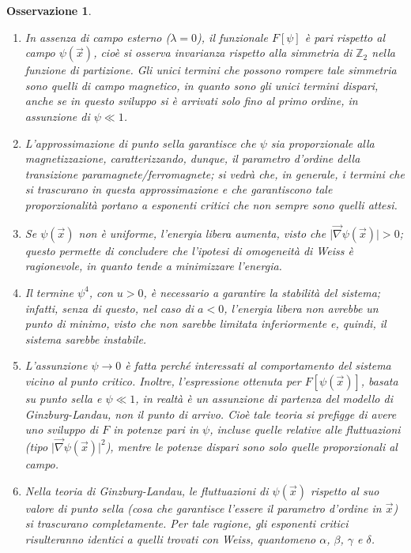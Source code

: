 \documentclass[11pt, a4paper]{scrartcl}
\theoremstyle{style}
\newtheorem{osservazione}{Osservazione}[section]
\theoremstyle{style1}
\numberwithin{equation}{subsection}
\begin{document}
\begin{osservazione}
\begin{enumerate}[(1).]
	\item In assenza di campo esterno ($\lambda =0$), il funzionale $F[\psi ]$ \`e pari rispetto al campo $\psi (\vec{x})$, cio\`e si osserva invarianza rispetto alla simmetria di $\mathbb{Z}_2$ nella funzione di partizione.
		Gli unici termini che possono rompere tale simmetria sono quelli di campo magnetico, in quanto sono gli unici termini dispari, anche se in questo sviluppo si \`e arrivati solo fino al primo ordine, in assunzione di $\psi \ll 1$.
	\item L'approssimazione di punto sella garantisce che $\psi $ sia proporzionale alla magnetizzazione, caratterizzando, dunque, il \textit{parametro d'ordine} della transizione paramagnete/ferromagnete; si vedr\`a che, in generale, i termini che si trascurano in questa approssimazione e che garantiscono tale proporzionalit\`a portano a esponenti critici che non sempre sono quelli attesi.
	\item Se $\psi (\vec{x})$ non \`e uniforme, l'energia libera aumenta, visto che $\lvert \vec{\nabla }\psi (\vec{x}) \rvert >0$; questo permette di concludere che l'ipotesi di omogeneit\`a di Weiss \`e ragionevole, in quanto tende a minimizzare l'energia.
	\item Il termine $\psi ^4$, con $u>0$, \`e necessario a garantire la stabilit\`a del sistema; infatti, senza di questo, nel caso di $a<0$, l'energia libera non avrebbe un punto di minimo, visto che non sarebbe limitata inferiormente e, quindi, il sistema sarebbe instabile.
	\item L'assunzione $\psi \to 0$ \`e fatta perch\'e interessati al comportamento del sistema vicino al punto critico. 
		Inoltre, l'espressione ottenuta per $F[\psi (\vec{x})]$, basata su punto sella e $\psi \ll 1$, in realt\`a \`e un assunzione di partenza del modello di Ginzburg-Landau, non il punto di arrivo.
		Cio\`e tale teoria si prefigge di avere uno sviluppo di $F$ in potenze pari in $\psi $, incluse quelle relative alle fluttuazioni (tipo $\lvert \vec{\nabla }\psi (\vec{x}) \rvert ^2$), mentre le potenze dispari sono solo quelle proporzionali al campo.
	\item Nella teoria di Ginzburg-Landau, le fluttuazioni di $\psi (\vec{x})$ rispetto al suo valore di punto sella (cosa che garantisce l'essere il parametro d'ordine in $\vec{x}$) si trascurano completamente.
		Per tale ragione, gli esponenti critici risulteranno identici a quelli trovati con Weiss, quantomeno $\alpha$, $\beta$, $\gamma$ e $\delta $.
\end{enumerate}
\end{osservazione}
\end{document}
